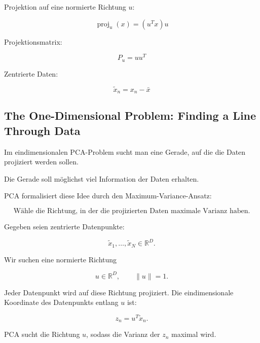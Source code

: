 \documentclass[11pt,a4paper]{scrartcl}
\begin{document}
\begin{answerbox}
    Projektion auf eine normierte Richtung \(u\):

    \[
        \boxed{
            \operatorname{proj}_u(x)
            =
            (u^Tx)u
        }
    \]

    Projektionsmatrix:

    \[
        \boxed{
            P_u = uu^T
        }
    \]

    Zentrierte Daten:

    \[
        \boxed{
            \tilde x_n = x_n-\bar x
        }
    \]
\end{answerbox}

\subsection{The One-Dimensional Problem: Finding a Line Through Data}

\begin{notebox}
    Im eindimensionalen PCA-Problem sucht man eine Gerade, auf die die Daten
    projiziert werden sollen.

    Die Gerade soll möglichst viel Information der Daten erhalten.

    PCA formalisiert diese Idee durch den Maximum-Variance-Ansatz:

    \[
        \text{Wähle die Richtung, in der die projizierten Daten maximale Varianz haben.}
    \]
\end{notebox}

\begin{solutionbox}
    Gegeben seien zentrierte Datenpunkte:

    \[
        \tilde x_1,\dots,\tilde x_N \in \mathbb{R}^D.
    \]

    Wir suchen eine normierte Richtung

    \[
        u \in \mathbb{R}^D,
        \qquad
        \|u\|=1.
    \]

    Jeder Datenpunkt wird auf diese Richtung projiziert. Die eindimensionale
    Koordinate des Datenpunkts entlang \(u\) ist:

    \[
        z_n
        =
        u^T \tilde x_n.
    \]

    PCA sucht die Richtung \(u\), sodass die Varianz der \(z_n\) maximal wird.
\end{solutionbox}
\end{document}
